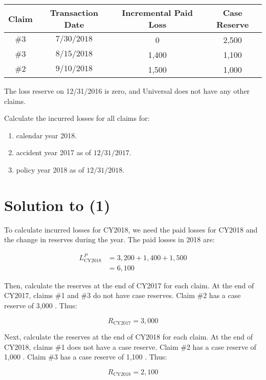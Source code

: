 \documentclass[10pt]{article}
\begin{document}
\begin{center}
\begin{tabular}{|c|c|c|c|}
\hline
Claim & Transaction Date & Incremental Paid Loss & Case Reserve \\
\hline
$\# 3$ & $7 / 30 / 2018$ & 0 & 2,500 \\
\hline
$\# 3$ & $8 / 15 / 2018$ & 1,400 & 1,100 \\
\hline
$\# 2$ & $9 / 10 / 2018$ & 1,500 & 1,000 \\
\hline
\end{tabular}
\end{center}

The loss reserve on 12/31/2016 is zero, and Universal does not have any other claims.

Calculate the incurred losses for all claims for:

\begin{enumerate}
  \item calendar year 2018.

  \item accident year 2017 as of $12 / 31 / 2017$.

  \item policy year 2018 as of $12 / 31 / 2018$.

\end{enumerate}

\section{Solution to (1)}
To calculate incurred losses for CY2018, we need the paid losses for CY2018 and the change in reserves during the year. The paid losses in 2018 are:

$$
\begin{aligned}
L_{\mathrm{CY} 2018}^{P} & =3,200+1,400+1,500 \\
& =6,100
\end{aligned}
$$

Then, calculate the reserves at the end of CY2017 for each claim. At the end of CY2017, claims \#1 and \#3 do not have case reserves. Claim \#2 has a case reserve of 3,000 . Thus:

$$
R_{\mathrm{CY} 2017}=3,000
$$

Next, calculate the reserves at the end of CY2018 for each claim. At the end of CY2018, claims \#1 does not have a case reserve. Claim \#2 has a case reserve of 1,000 . Claim \#3 has a case reserve of 1,100 . Thus:

$$
R_{\mathrm{CY} 2018}=2,100
$$
\end{document}
